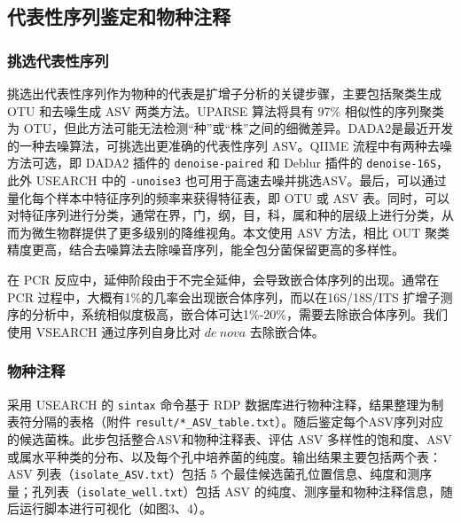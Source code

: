 \documentclass[UTF8]{ctexart}
\begin{document}
    

    \subsection{代表性序列鉴定和物种注释}

    \subsubsection{挑选代表性序列}

    挑选出代表性序列作为物种的代表是扩增子分析的关键步骤，主要包括聚类生成 OTU 和去噪生成 ASV 两类方法。UPARSE 算法将具有 97\% 相似性的序列聚类为 OTU，但此方法可能无法检测“种”或“株”之间的细微差异。DADA2是最近开发的一种去噪算法，可挑选出更准确的代表性序列 ASV。QIIME 流程中有两种去噪方法可选，即 DADA2 插件的 \verb|denoise-paired| 和 Deblur 插件的 \verb|denoise-16S|，此外 USEARCH 中的 \verb|-unoise3| 也可用于高速去噪并挑选ASV。最后，可以通过量化每个样本中特征序列的频率来获得特征表，即 OTU 或 ASV 表。同时，可以对特征序列进行分类，通常在界，门，纲，目，科，属和种的层级上进行分类，从而为微生物群提供了更多级别的降维视角。本文使用 ASV 方法，相比 OUT 聚类精度更高，结合去噪算法去除噪音序列，能全包分菌保留更高的多样性。

    在 PCR 反应中，延伸阶段由于不完全延伸，会导致嵌合体序列的出现。通常在 PCR 过程中，大概有1\%的几率会出现嵌合体序列，而以在16S/18S/ITS 扩增子测序的分析中，系统相似度极高，嵌合体可达1\%-20\%，需要去除嵌合体序列。我们使用 VSEARCH 通过序列自身比对 $de~nova$ 去除嵌合体。

    \subsubsection{物种注释}



    采用 USEARCH 的 \verb|sintax| 命令基于 RDP 数据库进行物种注释，结果整理为制表符分隔的表格（附件 \verb|result/*_ASV_table.txt|）。随后鉴定每个ASV序列对应的候选菌株。此步包括整合ASV和物种注释表、评估 ASV 多样性的饱和度、ASV 或属水平种类的分布、以及每个孔中培养菌的纯度。输出结果主要包括两个表：ASV 列表（\verb|isolate_ASV.txt|）包括 5 个最佳候选菌孔位置信息、纯度和测序量；孔列表（\verb|isolate_well.txt|）包括 ASV 的纯度、测序量和物种注释信息，随后运行脚本进行可视化（如图3、4）。
\end{document}
